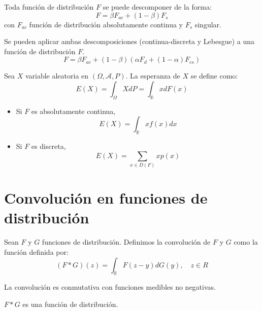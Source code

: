 \begin{theorem}
    Toda función de distribución $F$ se puede descomponer de la forma:
    $$F = \beta F_{ac} + (1-\beta)F_s$$
    con $F_{ac}$ función de distribución absolutamente continua y $F_s$ singular.
\end{theorem}

\begin{remark}
    Se pueden aplicar ambas descomposiciones (continua-discreta y Lebesgue) a una función de distribución $F$.
    $$F = \beta F_{ac} + (1-\beta) \left( \alpha F_{d} + (1-\alpha)F_{cs} \right)$$
\end{remark}

\begin{definition}[Esperanza]
    Sea $X$ variable aleatoria en $(\Omega, \mathcal{A}, P)$.
    La esperanza de $X$ se define como:
    $$E(X) = \int_\Omega X dP = \int_\mathbb{R} x dF(x)$$
\end{definition}

\begin{remark}
    \hfill
    \begin{itemize}
        \item Si $F$ es absolutamente continua,
              $$E(X) = \int_\mathbb{R} xf(x) dx$$
        \item Si $F$ es discreta,
              $$E(X) = \sum_{x \in D(F)} xp(x)$$
    \end{itemize}
\end{remark}

\section{Convolución en funciones de distribución}

\begin{definition}
    Sean $F$ y $G$ funciones de distribución.
    Definimos la convolución de $F$ y $G$ como la función definida por:
    $$(F \ast G)(z) = \int_\mathbb{R} F(z-y) dG(y), \quad z \in R$$
\end{definition}

\begin{note}
    La convolución es conmutativa con funciones medibles no negativas.
\end{note}

\begin{proposition}
    $F \ast G$ es una función de distribución.
\end{proposition}

